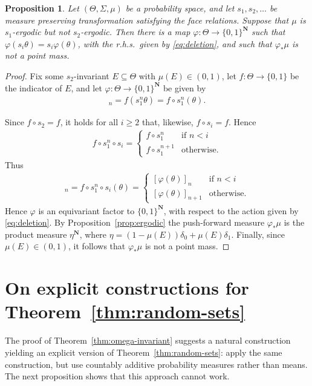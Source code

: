\documentclass[12pt, pdflatex]{amsart}
\newtheorem{proposition}[theorem]{Proposition}
\theoremstyle{definition}
\numberwithin{equation}{section}
\numberwithin{theorem}{section}
\newcommand{\NN}{\mathbf{N}}
\begin{document}
\begin{proposition}
 Let $(\Theta,\Sigma,\mu)$ be a probability space, and let $s_1,s_2,\ldots$ be measure preserving transformation satisfying the face relations. Suppose that $\mu$ is $s_1$-ergodic but not $s_2$-ergodic. Then there is a map $\varphi \colon \Theta \to \{0,1\}^\NN$ such that $\varphi(s_i\theta) = s_i\varphi(\theta)$, with the r.h.s.\ given by \eqref{eq:deletion}, and such that $\varphi_*\mu$ is not a point mass.
\end{proposition}
\begin{proof}
    Fix some $s_2$-invariant $E \subseteq \Theta$ with $\mu(E) \in (0,1)$, let $f \colon \Theta \to \{0,1\}$ be the indicator of $E$, and let $\varphi \colon \Theta \to \{0,1\}^\NN$ be given by
\begin{align*}
    [\varphi(\theta)]_n = f(s_1^n \theta) = f \circ s_1^n (\theta).
\end{align*}

Since $f \circ s_2 = f$, it holds for all $i \geq 2$ that, likewise, $f \circ s_i = f$. Hence 
\begin{align*}
    f \circ s_1^n \circ s_i = 
    \begin{cases}
    f \circ s_1^n&\text{if } n < i\\
    f \circ s_1^{n+1}&\text{otherwise.}
    \end{cases}
\end{align*}
Thus
\begin{align*}
    [\varphi (s_i \theta)]_n = f \circ s_1^n \circ s_i(\theta) = 
    \begin{cases}
        [\varphi (\theta)]_n &\text{if } n<i\\
        [\varphi (\theta)]_{n+1}&\text{otherwise.}
    \end{cases}
\end{align*}
Hence $\varphi$ is an equivariant factor to $\{0,1\}^\NN$, with respect to the action given by \eqref{eq:deletion}. By Proposition~\ref{prop:ergodic} the push-forward measure $\varphi_*\mu$ is the product measure $\eta^\NN$, where $\eta = (1-\mu(E))\delta_0+\mu(E)\delta_1$. Finally, since $\mu(E) \in (0,1)$, it follows that $\varphi_*\mu$ is not a point mass.
\end{proof}


\appendix

\section{On explicit constructions for Theorem~\ref{thm:random-sets}}\label{sec:explicit}
The proof of Theorem~\ref{thm:omega-invariant} suggests a natural construction yielding an explicit version of Theorem~\ref{thm:random-sets}: apply the same construction, but use countably additive probability measures rather than means. The next proposition shows that this approach cannot work. 
\end{document}
